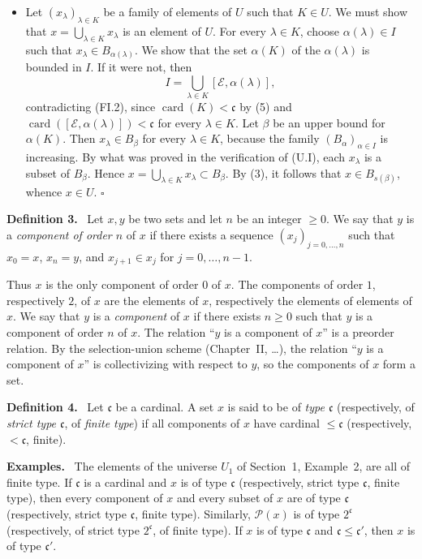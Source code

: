 \documentclass[11pt]{article}
\newcommand{\card}{\operatorname{card}}
\newcommand{\Pset}{\mathcal{P}}
\newcommand{\qedtext}{\hfill\(\square\)}
\newenvironment{statement}[1]{\par\medskip\noindent\textbf{#1.}\ }{\par\medskip}
\newenvironment{remarktext}[1]{\par\medskip\noindent\textbf{#1.}\ }{\par\medskip}
\begin{document}
\begin{itemize}[leftmargin=4em]
\item[(U.IV)] Let \((x_\lambda)_{\lambda\in K}\) be a family of elements of \(U\) such that \(K\in U\). We must show that \(x=\bigcup_{\lambda\in K}x_\lambda\) is an element of \(U\). For every \(\lambda\in K\), choose \(\alpha(\lambda)\in I\) such that \(x_\lambda\in B_{\alpha(\lambda)}\). We show that the set \(\alpha(K)\) of the \(\alpha(\lambda)\) is bounded in \(I\). If it were not, then
\[
 I=\bigcup_{\lambda\in K}[\mathcal E,\alpha(\lambda)],
\]
contradicting (FI.2), since \(\card(K)<\mathfrak c\) by (5) and \(\card([\mathcal E,\alpha(\lambda)])<\mathfrak c\) for every \(\lambda\in K\). Let \(\beta\) be an upper bound for \(\alpha(K)\). Then \(x_\lambda\in B_\beta\) for every \(\lambda\in K\), because the family \((B_\alpha)_{\alpha\in I}\) is increasing. By what was proved in the verification of (U.I), each \(x_\lambda\) is a subset of \(B_\beta\). Hence \(x=\bigcup_{\lambda\in K}x_\lambda\subset B_\beta\). By (3), it follows that \(x\in B_{s(\beta)}\), whence \(x\in U\). \qedtext
\end{itemize}

\begin{statement}{Definition 3}
Let \(x,y\) be two sets and let \(n\) be an integer \(\geq0\). We say that \(y\) is a \emph{component of order \(n\)} of \(x\) if there exists a sequence \((x_j)_{j=0,\ldots,n}\) such that \(x_0=x\), \(x_n=y\), and \(x_{j+1}\in x_j\) for \(j=0,\ldots,n-1\).
\end{statement}
Thus \(x\) is the only component of order \(0\) of \(x\). The components of order \(1\), respectively \(2\), of \(x\) are the elements of \(x\), respectively the elements of elements of \(x\). We say that \(y\) is a \emph{component} of \(x\) if there exists \(n\geq0\) such that \(y\) is a component of order \(n\) of \(x\). The relation ``\(y\) is a component of \(x\)'' is a preorder relation. By the selection-union scheme (Chapter~II, \ldots), the relation ``\(y\) is a component of \(x\)'' is collectivizing with respect to \(y\), so the components of \(x\) form a set.

\begin{statement}{Definition 4}
Let \(\mathfrak c\) be a cardinal. A set \(x\) is said to be of \emph{type \(\mathfrak c\)} (respectively, of \emph{strict type \(\mathfrak c\)}, of \emph{finite type}) if all components of \(x\) have cardinal \(\leq\mathfrak c\) (respectively, \(<\mathfrak c\), finite).
\end{statement}

\begin{remarktext}{Examples}
The elements of the universe \(U_1\) of Section~1, Example~2, are all of finite type. If \(\mathfrak c\) is a cardinal and \(x\) is of type \(\mathfrak c\) (respectively, strict type \(\mathfrak c\), finite type), then every component of \(x\) and every subset of \(x\) are of type \(\mathfrak c\) (respectively, strict type \(\mathfrak c\), finite type). Similarly, \(\Pset(x)\) is of type \(2^{\mathfrak c}\) (respectively, of strict type \(2^{\mathfrak c}\), of finite type). If \(x\) is of type \(\mathfrak c\) and \(\mathfrak c\leq\mathfrak c'\), then \(x\) is of type \(\mathfrak c'\).
\end{remarktext}
\end{document}
